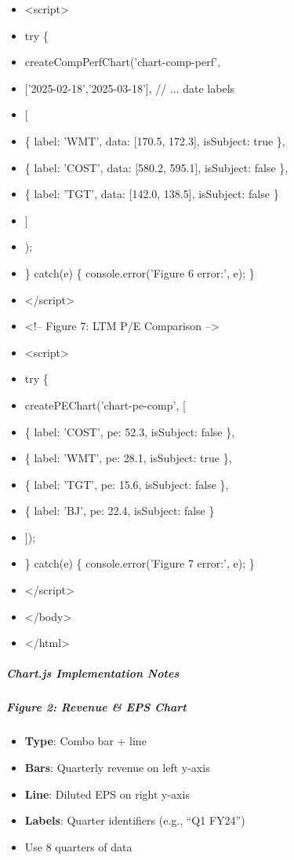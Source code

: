 \documentclass[11pt]{article}
\begin{document}
\begin{itemize}[leftmargin=*,itemsep=2pt,topsep=2pt]
\item {} <script>
\item {} try \{
\item {} createCompPerfChart('chart-comp-perf',
\item {} ['2025-02-18','2025-03-18'], // ... date labels
\item {} [
\item {} \{ label: 'WMT', data: [170.5, 172.3], isSubject: true \},
\item {} \{ label: 'COST', data: [580.2, 595.1], isSubject: false \},
\item {} \{ label: 'TGT', data: [142.0, 138.5], isSubject: false \}
\item {} ]
\item {} );
\item {} \} catch(e) \{ console.error('Figure 6 error:', e); \}
\item {} </script>
\item {} <!-- Figure 7: LTM P/E Comparison -->
\item {} <script>
\item {} try \{
\item {} createPEChart('chart-pe-comp', [
\item {} \{ label: 'COST', pe: 52.3, isSubject: false \},
\item {} \{ label: 'WMT', pe: 28.1, isSubject: true \},
\item {} \{ label: 'TGT', pe: 15.6, isSubject: false \},
\item {} \{ label: 'BJ', pe: 22.4, isSubject: false \}
\item {} ]);
\item {} \} catch(e) \{ console.error('Figure 7 error:', e); \}
\item {} </script>
\item {} </body>
\item {} </html>
\end{itemize}

\subparagraph{Chart.js Implementation Notes}\mbox{}\par

\subparagraph{Figure 2: Revenue \& EPS Chart}\mbox{}\par
\begin{itemize}[leftmargin=*,itemsep=2pt,topsep=2pt]
\item {} \textbf{Type}: Combo bar + line
\item {} \textbf{Bars}: Quarterly revenue on left y-axis
\item {} \textbf{Line}: Diluted EPS on right y-axis
\item {} \textbf{Labels}: Quarter identifiers (e.g., ``Q1 FY24'')
\item {} Use 8 quarters of data
\end{itemize}
\end{document}
